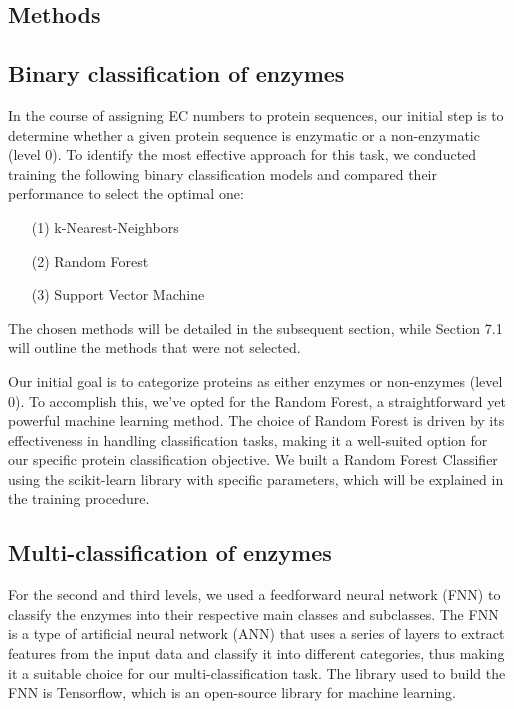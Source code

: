 \documentclass{bioinfo}
\begin{document}
\begin{methods}
\section{Methods}
\subsection{Binary classification of enzymes}
In the course of assigning EC numbers to protein sequences,
our initial step is to determine whether a given protein sequence is enzymatic or a non-enzymatic (level 0).
To identify the most effective approach for this task,
we conducted training the following binary classification models and compared their performance to select the optimal one:
\begin{enumerate}
	\item[(1)] k-Nearest-Neighbors
	\item[(2)] Random Forest 
	\item[(3)] Support Vector Machine
\end{enumerate}

The chosen methods will be detailed in the subsequent section, while Section 7.1 will outline the methods that were not selected.

Our initial goal is to categorize proteins as either enzymes or non-enzymes (level 0). 
To accomplish this, we've opted for the Random Forest, a straightforward yet powerful machine learning method.
The choice of Random Forest is driven by its effectiveness in handling classification tasks, making it a well-suited option for our specific protein classification objective.
We built a Random Forest Classifier using the scikit-learn library with specific parameters, which will be explained in the training procedure. 

\subsection{Multi-classification of enzymes}
For the second and third levels, we used a feedforward neural network (FNN) to classify the enzymes into their respective main classes and subclasses.
The FNN is a type of artificial neural network (ANN) that uses a series of layers to extract features from the input data and classify it into different categories,
thus making it a suitable choice for our multi-classification task. The library used to build the FNN is Tensorflow, which is an open-source library for machine learning.


\end{methods}
\end{document}

